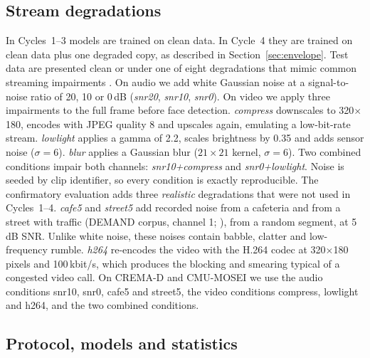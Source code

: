 \subsection{Stream degradations}

In Cycles~1--3 models are trained on clean data. In Cycle~4 they are trained on clean data plus one degraded copy, as described in Section~\ref{sec:envelope}. Test data are presented clean or under one of eight degradations that mimic common streaming impairments \citep{hendrycks2019}. On audio we add white Gaussian noise at a signal-to-noise ratio of 20, 10 or 0\,dB (\emph{snr20}, \emph{snr10}, \emph{snr0}). On video we apply three impairments to the full frame before face detection. \emph{compress} downscales to 320$\times$180, encodes with JPEG quality 8 and upscales again, emulating a low-bit-rate stream. \emph{lowlight} applies a gamma of 2.2, scales brightness by 0.35 and adds sensor noise ($\sigma=6$). \emph{blur} applies a Gaussian blur ($21\times21$ kernel, $\sigma=6$). Two combined conditions impair both channels: \emph{snr10+compress} and \emph{snr0+lowlight}. Noise is seeded by clip identifier, so every condition is exactly reproducible. The confirmatory evaluation adds three \emph{realistic} degradations that were not used in Cycles~1--4. \emph{cafe5} and \emph{street5} add recorded noise from a cafeteria and from a street with traffic (DEMAND corpus, channel 1; \citealp{thiemann2013}), from a random segment, at 5\,dB SNR. Unlike white noise, these noises contain babble, clatter and low-frequency rumble. \emph{h264} re-encodes the video with the H.264 codec \citep{wiegand2003} at 320$\times$180 pixels and 100\,kbit/s, which produces the blocking and smearing typical of a congested video call. On CREMA-D and CMU-MOSEI we use the audio conditions snr10, snr0, cafe5 and street5, the video conditions compress, lowlight and h264, and the two combined conditions.

\subsection{Protocol, models and statistics}

